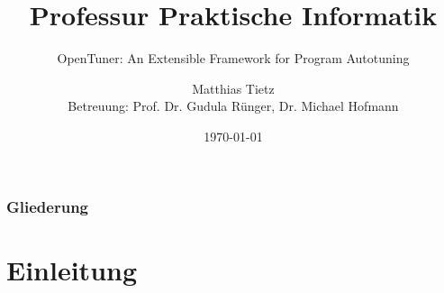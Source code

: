 \title{Professur Praktische Informatik}
\subtitle{OpenTuner: An Extensible Framework for Program Autotuning}
\author{Matthias Tietz\\Betreuung: Prof. Dr. Gudula Rünger, Dr. Michael Hofmann}


\date{\today}
\institute[TUC]


    \tucthreeheadlines
    \begin{frame}
      \titlepage
    \end{frame}

    \tucnarrowframe
    \begingroup

    \begin{frame}
      \frametitle{Gliederung}
      \tableofcontents
    \end{frame}

    \endgroup
    \tucwideframe
    \tuctwoheadlines

    

    \section{Einleitung}
    


